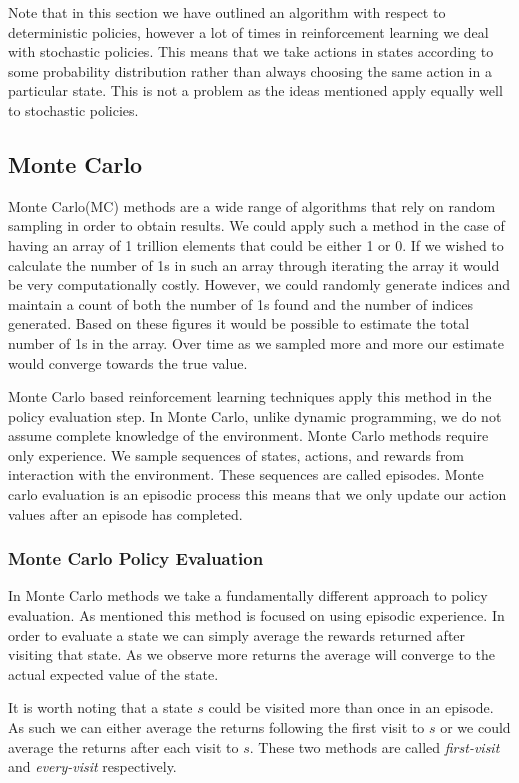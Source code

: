 Note that in this section we have outlined an algorithm with respect to deterministic policies,
however a lot of times in reinforcement learning we deal with stochastic policies.
This means that we take actions in states according to some probability distribution rather than always choosing
the same action in a particular state.
This is not a problem as the ideas mentioned apply equally well to stochastic policies.

\subsection{Monte Carlo}\label{subsec:mc}
Monte Carlo(MC) methods are a wide range of algorithms that rely on random sampling in order to obtain results.
We could apply such a method in the case of having an array of 1 trillion elements that could be
either 1 or 0.
If we wished to calculate the number of 1s in such an array through iterating the array it would
be very computationally costly.
However, we could randomly generate indices and maintain a count of both the number of 1s found
and the number of indices generated.
Based on these figures it would be possible to estimate the total number of 1s in the array.
Over time as we sampled more and more our estimate would converge towards the true value.

Monte Carlo based reinforcement learning techniques apply this method in the policy evaluation step.
In Monte Carlo, unlike dynamic programming, we do not assume complete knowledge of the environment.
Monte Carlo methods require only experience.
We sample sequences of states, actions, and rewards from interaction with the
environment\citep{sutton1998reinforcement}.
These sequences are called episodes.
Monte carlo evaluation is an episodic process this means that we only update our action values after an episode
has completed.

\subsubsection{Monte Carlo Policy Evaluation}
In Monte Carlo methods we take a fundamentally different approach to policy evaluation.
As mentioned this method is focused on using episodic experience.
In order to evaluate a state we can simply average the rewards returned after visiting that state.
As we observe more returns the average will converge to the actual expected value of the state.

It is worth noting that a state $s$ could be visited more than once in an episode.
As such we can either average the returns following the first visit to $s$ or we could average the returns
after each visit to $s$.
These two methods are called \textit{first-visit} and \textit{every-visit} respectively.

